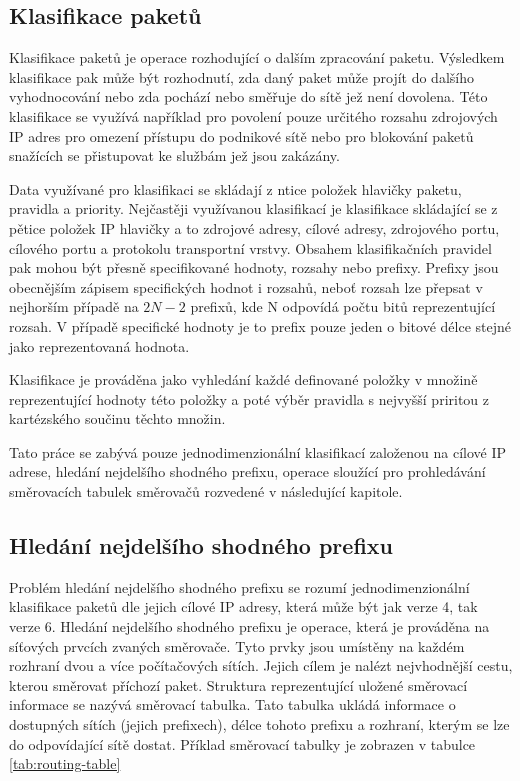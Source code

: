 \subsection{Klasifikace paketů}

Klasifikace paketů je operace rozhodující o dalším zpracování paketu.
Výsledkem klasifikace pak může být rozhodnutí, zda daný paket může projít do
dalšího vyhodnocování nebo zda pochází nebo směřuje do sítě jež není dovolena.
Této klasifikace se využívá například pro povolení pouze určitého rozsahu zdrojových IP adres
pro omezení přístupu do podnikové sítě nebo pro blokování paketů snažících se přistupovat
ke službám jež jsou zakázány.

Data využívané pro klasifikaci se skládají z ntice položek hlavičky paketu, pravidla a priority.
Nejčastěji využívanou klasifikací je klasifikace skládající se z pětice položek IP hlavičky
a to zdrojové adresy, cílové adresy, zdrojového portu, cílového portu a protokolu transportní vrstvy.
Obsahem klasifikačních pravidel pak mohou být přesně specifikované hodnoty, rozsahy nebo prefixy.
Prefixy jsou obecnějším zápisem specifických hodnot i rozsahů, neboť rozsah lze přepsat v nejhorším
případě na $2N - 2$ prefixů, kde N odpovídá počtu bitů reprezentující rozsah. V případě specifické hodnoty
je to prefix pouze jeden o bitové délce stejné jako reprezentovaná hodnota.

Klasifikace je prováděna jako vyhledání každé definované položky v množině reprezentující hodnoty
této položky a poté výběr pravidla s nejvyšší priritou z kartézského součinu těchto množin.

Tato práce se zabývá pouze jednodimenzionální klasifikací založenou na cílové IP adrese, hledání
nejdelšího shodného prefixu, operace sloužící pro prohledávání směrovacích tabulek směrovačů
rozvedené v následující kapitole.

\subsection{Hledání nejdelšího shodného prefixu}\label{section:lpm} %
Problém hledání nejdelšího shodného prefixu se rozumí jednodimenzionální klasifikace paketů dle
jejich cílové IP adresy, která může být jak verze 4, tak verze 6.
Hledání nejdelšího shodného prefixu je operace, která je prováděna
na síťových prvcích zvaných směrovače. Tyto prvky jsou umístěny na každém rozhraní dvou a více
počítačových sítích. Jejich cílem je nalézt nejvhodnější cestu, kterou směrovat příchozí paket.
Struktura reprezentující uložené směrovací informace se nazývá směrovací tabulka.
Tato tabulka ukládá informace o dostupných sítích (jejich prefixech), délce tohoto prefixu a rozhraní,
kterým se lze do odpovídající sítě dostat. Příklad směrovací tabulky je zobrazen v tabulce \ref{tab:routing-table}

